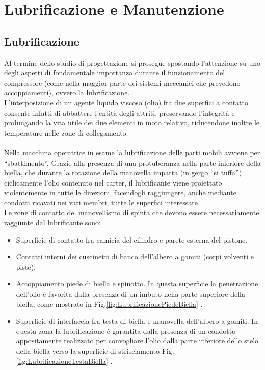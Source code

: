 \section{Lubrificazione e Manutenzione}
\subsection{Lubrificazione}
Al termine dello studio di progettazione si prosegue spostando l’attenzione su uno degli aspetti di fondamentale importanza durante il funzionamento del compressore (come nella maggior parte dei sistemi meccanici che prevedono accoppiamenti), ovvero la lubrificazione.\\
L’interposizione di un agente liquido viscoso (olio) fra due superfici a contatto consente infatti di abbattere l’entità degli attriti, preservando l’integrità e prolungando la vita utile dei due elementi in moto relativo, riducendone inoltre le temperature nelle zone di collegamento.\\
\\
Nella macchina operatrice in esame la lubrificazione delle parti mobili avviene per “sbattimento”. Grazie alla presenza di una protuberanza nella parte inferiore della biella, che durante la rotazione della manovella impatta (in gergo “si tuffa”) ciclicamente l’olio contenuto nel carter, il lubrificante viene proiettato violentemente in tutte le direzioni, facendogli raggiungere, anche mediante condotti ricavati nei vari membri, tutte le superfici interessate. \\
Le zone di contatto del manovellismo di spinta che devono essere necessariamente raggiunte dal lubrificante sono:
\begin{itemize}
    \item Superficie di contatto fra camicia del cilindro e parete esterna del pistone.
    \item Contatti interni dei cuscinetti di banco dell’albero a gomiti (corpi volventi e piste).
    \item Accoppiamento piede di biella e spinotto. In questa superficie la penetrazione dell’olio è favorita dalla presenza di un imbuto nella parte superiore della biella, come mostrato in Fig.\ref{fig:LubrificazionePiedeBiella} .
    \item Superficie di interfaccia fra testa di biella e manovella dell’albero a gomiti. In questa zona la lubrificazione è garantita dalla presenza di un condotto appositamente realizzato per convogliare l’olio dalla parte inferiore dello stelo della biella verso la superficie di strisciamento Fig.\ref{fig:LubrificazioneTestaBiella} .
\end{itemize}
